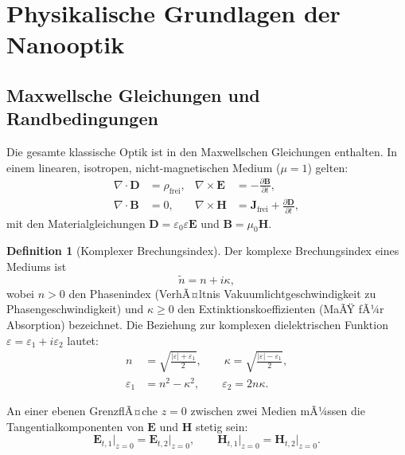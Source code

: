 ﻿\documentclass[a4paper,12pt]{article}
\theoremstyle{definition}
\newtheorem{definition}{Definition}[section]
\newcommand{\vect}[1]{\bm{#1}}
\begin{document}
	\section{Physikalische Grundlagen der Nanooptik}
	\label{sec:grundlagen}
	
	\subsection{Maxwellsche Gleichungen und Randbedingungen}
	
	Die gesamte klassische Optik ist in den Maxwellschen Gleichungen enthalten.
	In einem linearen, isotropen, nicht-magnetischen Medium ($\mu = 1$) gelten:
	\begin{align}
		\nabla \cdot \vect{D} &= \rho_\mathrm{frei}, &
		\nabla \times \vect{E} &= -\frac{\partial \vect{B}}{\partial t}, \label{eq:maxwell1}\\
		\nabla \cdot \vect{B} &= 0, &
		\nabla \times \vect{H} &= \vect{J}_\mathrm{frei} + \frac{\partial \vect{D}}{\partial t},
		\label{eq:maxwell2}
	\end{align}
	mit den Materialgleichungen $\vect{D} = \varepsilon_0 \varepsilon \vect{E}$
	und $\vect{B} = \mu_0 \vect{H}$.
	
	\begin{definition}[Komplexer Brechungsindex]
		\label{def:brechungsindex}
		Der komplexe Brechungsindex eines Mediums ist
		\[
		\tilde{n} = n + i\kappa,
		\]
		wobei $n > 0$ den Phasenindex (VerhÃ¤ltnis Vakuumlichtgeschwindigkeit zu
		Phasengeschwindigkeit) und $\kappa \geq 0$ den Extinktionskoeffizienten
		(MaÃŸ fÃ¼r Absorption) bezeichnet. Die Beziehung zur komplexen dielektrischen
		Funktion $\varepsilon = \varepsilon_1 + i\varepsilon_2$ lautet:
		\begin{align}
			n &= \sqrt{\frac{|\varepsilon| + \varepsilon_1}{2}}, \qquad
			\kappa = \sqrt{\frac{|\varepsilon| - \varepsilon_1}{2}},\\
			\varepsilon_1 &= n^2 - \kappa^2, \qquad
			\varepsilon_2 = 2n\kappa.
		\end{align}
	\end{definition}
	
	An einer ebenen GrenzflÃ¤che $z = 0$ zwischen zwei Medien
	mÃ¼ssen die Tangentialkomponenten von $\vect{E}$ und $\vect{H}$ stetig sein:
	\begin{equation}
		\vect{E}_{t,1}\big|_{z=0} = \vect{E}_{t,2}\big|_{z=0}, \qquad
		\vect{H}_{t,1}\big|_{z=0} = \vect{H}_{t,2}\big|_{z=0}.
	\end{equation}
	
\end{document}
